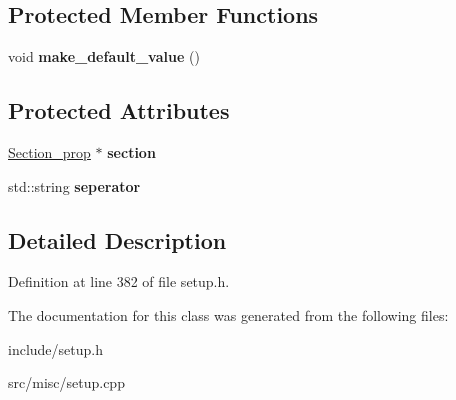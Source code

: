 \subsection*{Protected Member Functions}
\begin{DoxyCompactItemize}
\item 
\hypertarget{classProp__multival_a0a894a156a00f00d82f119a415619498}{void {\bfseries make\-\_\-default\-\_\-value} ()}\label{classProp__multival_a0a894a156a00f00d82f119a415619498}

\end{DoxyCompactItemize}
\subsection*{Protected Attributes}
\begin{DoxyCompactItemize}
\item 
\hypertarget{classProp__multival_a81ace37ba9062aea3513ddb30ccba50d}{\hyperlink{classSection__prop}{Section\-\_\-prop} $\ast$ {\bfseries section}}\label{classProp__multival_a81ace37ba9062aea3513ddb30ccba50d}

\item 
\hypertarget{classProp__multival_a507b96adb6fb9aafdec560cacff2d2ad}{std\-::string {\bfseries seperator}}\label{classProp__multival_a507b96adb6fb9aafdec560cacff2d2ad}

\end{DoxyCompactItemize}


\subsection{Detailed Description}


Definition at line 382 of file setup.\-h.



The documentation for this class was generated from the following files\-:\begin{DoxyCompactItemize}
\item 
include/setup.\-h\item 
src/misc/setup.\-cpp\end{DoxyCompactItemize}
